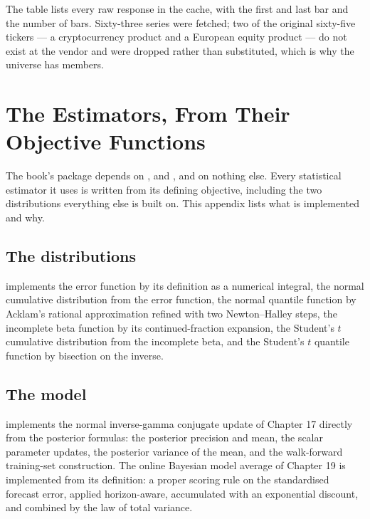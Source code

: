 The table lists every raw response in the cache, with the first and last
bar and the number of bars. Sixty-three series were fetched; two of the
original sixty-five tickers --- a cryptocurrency product and a European
equity product --- do not exist at the vendor and were dropped rather than
substituted, which is why the universe has \numNFunds{} members.

\begingroup
\scriptsize

\endgroup
\clearpage

\chapter{The Estimators, From Their Objective Functions}
\label{app:estimators}

\thispagestyle{plain}

The book's package depends on ,  and
, and on nothing else. Every statistical estimator it
uses is written from its defining objective, including the two
distributions everything else is built on. This appendix lists what is
implemented and why.

\section{The distributions}

 implements the error function by its
definition as a numerical integral, the normal cumulative distribution
from the error function, the normal quantile function by Acklam's rational
approximation refined with two Newton--Halley steps, the incomplete beta
function by its continued-fraction expansion, the Student's \(t\)
cumulative distribution from the incomplete beta, and the Student's \(t\)
quantile function by bisection on the inverse.

\section{The model}

 implements the normal inverse-gamma
conjugate update of Chapter 17 directly from the posterior formulas: the
posterior precision and mean, the scalar parameter updates, the
posterior variance of the mean, and the walk-forward training-set
construction. The online Bayesian model average of Chapter 19 is
implemented from its definition: a proper scoring rule on the standardised
forecast error, applied horizon-aware, accumulated with an exponential
discount, and combined by the law of total variance.

